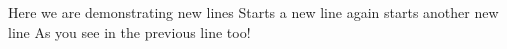 \documentclass{article} %
\begin{document}
Here we are demonstrating new lines
\newline Starts a new line
\newline again starts another new line\newline
As you see in the previous line too!
\end{document}

